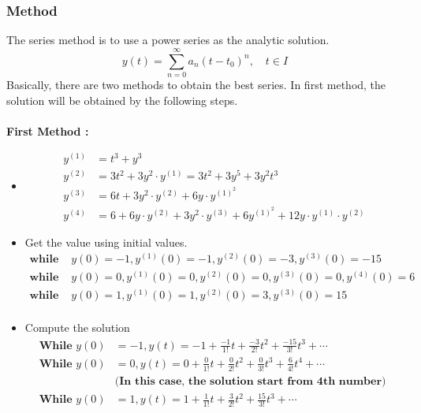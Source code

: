 \documentclass{article}
\begin{document}
\subsubsection{Method}
    The series method is to use a power series as the analytic solution.
    \[
        y(t) = \sum_{n=0}^{\infty} a_n (t - t_0)^n, \quad t \in I
    \]
    Basically, there are two methods to obtain the best series. In first method, the solution will be obtained by the following steps.
\\ \\
\textbf{First Method :}
\begin{itemize}
\item  {}
\begin{align*}
y^{(1)} &= t^3 + y^3 \\
y^{(2)} &= 3t^2 + 3y^2 \cdot y^{(1)}=3t^2 + 3 y^5 + 3y^2t^3 \\ 
y^{(3)} &= 6t + 3 y^2 \cdot y^{(2)} + 6y \cdot y^{(1)^2} \\
y^{(4)} &= 6 + 6y \cdot y^{(2)} +3 y^2 \cdot y^{(3)} + 6 y^{(1)^2} + 12y \cdot y^{(1)} \cdot y^{(2)}
\end{align*}
\end{itemize}


\begin{itemize}
    \item Get the value using initial values.
\begin{align*}
\textbf{while } & y(0) = -1,y^{(1)}(0) = -1,y^{(2)}(0) = -3,y^{(3)}(0) = -15 \\
\textbf{while } & y(0) = 0,y^{(1)}(0) = 0,y^{(2)}(0) = 0,y^{(3)}(0) = 0,y^{(4)}(0) = 6 \\
\textbf{while } & y(0) = 1,y^{(1)}(0) = 1,y^{(2)}(0) = 3,y^{(3)}(0) = 15 \\
\end{align*}
\end{itemize}

\begin{itemize}
    \item Compute the solution
\begin{align*}
    \textbf{While } y(0) &= -1,y(t) = -1 + \frac{-1}{1!}t + \frac{-3}{2!} t^2 + \frac{-15}{3!} t^3 + \cdots \\
    \textbf{While } y(0) &= 0,
    y(t) = 0 + \frac{0}{1!}t + \frac{0}{2!} t^2 + \frac{0}{3!} t^3 + \frac{6}{4!} t^4 + 
   \cdots \\
    & \textbf{(In this case, the solution start from 4th number) }
\\
    \textbf{While } y(0) &= 1,
    y(t) = 1 + \frac{1}{1!}t + \frac{3}{2!} t^2 + \frac{15}{3!} t^3 + \cdots \\
\end{align*}
\end{itemize}
\end{document}
